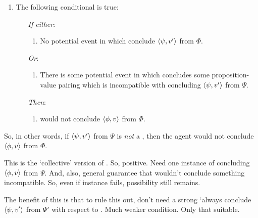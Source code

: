 \begin{note}[\requ{3}]
\begin{definition}[A \requ{0}]
\begin{itemize}
      \begin{enumerate}[label=\arabic*., ref=\named{R:\arabic*}, resume]
      \item
        \label{idea:requ:nPsi-nPhi}
        The following conditional is true:
        \begin{enumerate}
        \item[\emph{If either}:]
          \begin{enumerate}[label=\alph*., ref=\named{R:2\alph*}]
          \item
            \label{idea:requ:nPsi-nPhi:opp}
            No potential event in which conclude \(\langle \psi, v' \rangle\) from \(\Phi\).
          \end{enumerate}
        \item[\emph{Or}:]
          \begin{enumerate}[label=\alph*., ref=\named{R:2\alph*}, resume]
          \item
            \label{idea:requ:nPsi-nPhi:link}
            There is some potential event in which \vAgent{} concludes some proposition-value pairing which is incompatible with concluding \(\langle \psi, v' \rangle\) from \(\Psi\).
          \end{enumerate}
        \item[\emph{Then}:]
          \begin{enumerate}[label=\alph*., ref=\named{R:2\alph*}, resume]
            \label{idea:requ:nPsi-nPhi:fail}
          \item
            \vAgent{} would not conclude \(\langle \phi, v \rangle\) from \(\Phi\).
          \end{enumerate}
        \end{enumerate}
      \end{enumerate}
    \end{itemize}
    \vspace{-\baselineskip}
  \end{definition}

  So, in other words, if \(\langle \psi, v' \rangle\) from \(\Psi\) is \emph{not} a \fc{}, then the agent would not conclude \(\langle \phi, v \rangle\) from \(\Phi\).

  {
    \color{blue}
    This is the `collective' version of \requ{}.
    So, positive.
    Need one instance of concluding \(\langle \phi, v \rangle\) from \(\Psi\).
    And, also, general guarantee that wouldn't conclude something incompatible.
    So, even if instance fails, possibility still remains.

    The benefit of this is that to rule this out, don't need a strong `always conclude \(\langle \psi, v' \rangle\) from \(\Psi\)' with respect to \qzS{}.
    Much weaker condition.
    Only that suitable.

}
\end{note}
